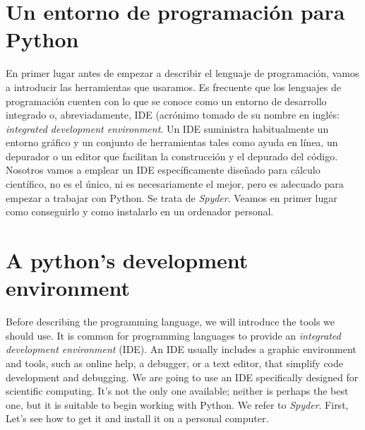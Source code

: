 \begin{paracol}{2}
\section[Un entorno de programación para Python]{Un entorno de programación para Python}
En primer lugar antes de empezar a describir el lenguaje de programación, vamos a introducir las herramientas  que usaramos. Es frecuente que los lenguajes de programación cuenten con lo que se conoce como un entorno de desarrollo integrado o, abreviadamente, IDE (acrónimo tomado de su nombre en inglés: \emph{integrated development environment}. Un IDE suministra habitualmente un entorno gráfico y un conjunto de herramientas tales como ayuda en línea, un depurador o un editor que facilitan la construcción y el depurado del código. Nosotros vamos a emplear un IDE específicamente diseñado para cálculo científico, no es el único, ni es necesariamente el mejor, pero es adecuado para empezar a trabajar con Python. Se trata de \emph{Spyder}. Veamos en primer lugar como conseguirlo y como instalarlo en un ordenador personal.

\switchcolumn
\section{A python's development environment}
Before describing the programming language, we will introduce the tools we should use. It is common for programming languages to provide an \emph{integrated development environment} (IDE). An IDE usually includes a graphic environment and tools, such as online help,  a debugger, or a text editor, that simplify code development and debugging. We are going to use an IDE specifically designed for scientific computing. It's not the only one available; neither is perhaps the best one, but it is suitable to begin working with Python. We refer to \emph{Spyder}. First, Let's see how to get it and install it on a personal computer.
\end{paracol}
